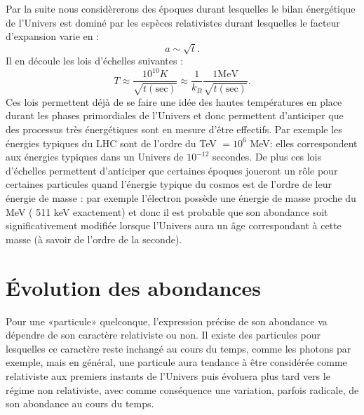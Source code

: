 Par la suite nous considèrerons des époques durant lesquelles le bilan énergétique de l'Univers est dominé par les espèces relativistes durant lesquelles le facteur d'expansion varie en :
\begin{equation}
a\sim \sqrt t.
\end{equation}
Il en découle les lois d'échelles suivantes :
\begin{equation}
T\approx\frac{10^{10} K}{\sqrt{t\mathrm{(sec)}}} \approx \frac{1}{k_B}\frac{1 \mathrm{MeV}}{\sqrt{t\mathrm{(sec)}}}.
\end{equation}
Ces lois permettent déjà de se faire une idée des hautes températures en place durant les phases primordiales de l'Univers et donc permettent d'anticiper que des processus très énergétiques sont en mesure d'être effectifs. Par exemple les énergies typiques du LHC sont de l'ordre du TeV $=10^6$ MeV: elles correspondent aux énergies typiques dans un Univers de $10^{-12}$ secondes. De plus ces lois d'échelles permettent d'anticiper que certaines époques joueront un rôle pour certaines particules quand l'énergie typique du cosmos est de l'ordre de leur énergie de masse : par exemple l'électron possède une énergie de masse proche du MeV ( 511 keV exactement) et donc il est probable que son abondance soit significativement modifiée lorsque l'Univers aura un âge correspondant à cette masse (à savoir de l'ordre de la seconde).


\section{Évolution des abondances}
Pour une «particule» quelconque, l'expression précise de son abondance va dépendre de son caractère relativiste ou non. Il existe des particules pour lesquelles ce caractère reste inchangé au cours du temps, comme les photons par exemple, mais en général, une particule aura tendance à être considérée comme relativiste aux premiers instants de l'Univers puis évoluera plus tard vers le régime non relativiste, avec comme conséquence une variation, parfois radicale, de son abondance au cours du temps.

